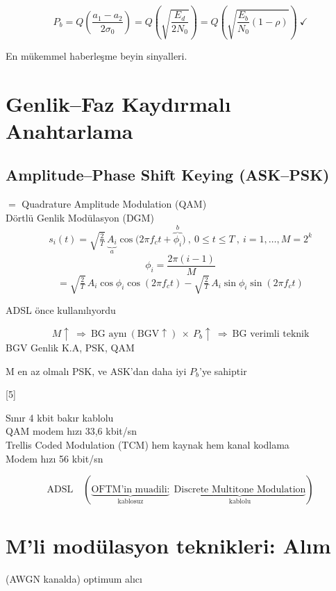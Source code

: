 \documentclass[11pt,a4paper]{article}
\begin{document}
\[ P_b=Q\!\left(\frac{a_1-a_2}{2\sigma_0}\right)=Q\!\left(\sqrt{\frac{E_d}{2N_0}}\right)=Q\!\left(\sqrt{\frac{E_b}{N_0}(1-\rho)}\right)\ \checkmark \]

En mükemmel haberleşme beyin sinyalleri.

\section{Genlik--Faz Kaydırmalı Anahtarlama}
\subsection{Amplitude--Phase Shift Keying (ASK--PSK)}
$=$ Quadrature Amplitude Modulation (QAM)\\
\hspace*{2em}Dörtlü Genlik Modülasyon (DGM)
\[ s_i(t)=\sqrt{\tfrac{2}{T}}\,\underbrace{A_i}_{a}\cos\bigl(2\pi f_ct+\overbrace{\phi_i}^{b}\bigr)\ ,\ 0\le t\le T\ ,\ i=1,\dots,M=2^k \]
\[ \phi_i=\frac{2\pi(i-1)}{M} \]
\[ =\sqrt{\tfrac{2}{T}}\,A_i\cos\phi_i\cos(2\pi f_ct)-\sqrt{\tfrac{2}{T}}\,A_i\sin\phi_i\sin(2\pi f_ct) \]
\begin{flushright}
ADSL  önce kullanılıyordu
\end{flushright}
\[ M\uparrow\ \Rightarrow\ \text{BG aynı}\ (\mathrm{BGV}\uparrow)\ \times\ P_b\uparrow\ \Rightarrow\ \text{BG verimli teknik} \]
BGV \quad Genlik K.A, PSK, QAM

M en az \okunamadi{} olmalı \hfill PSK, ve ASK'dan daha iyi $P_b$'ye sahiptir

[5]

Sınır 4 kbit bakır kablolu\\
\hspace*{1.5em}QAM modem hızı 33,6 kbit/sn\\
\hspace*{1.5em}Trellis Coded Modulation (TCM) \quad hem kaynak hem kanal kodlama\\
\hspace*{3em}Modem hızı 56 kbit/sn

\[ \text{ADSL}\quad(\underbrace{\text{OFTM'in muadili:}}_{\text{kablosuz}}\ \ \underbrace{\text{Discrete Multitone Modulation}}_{\text{kablolu}}) \]

\section{M'li modülasyon teknikleri: Alım}
(AWGN kanalda) optimum alıcı
\end{document}
